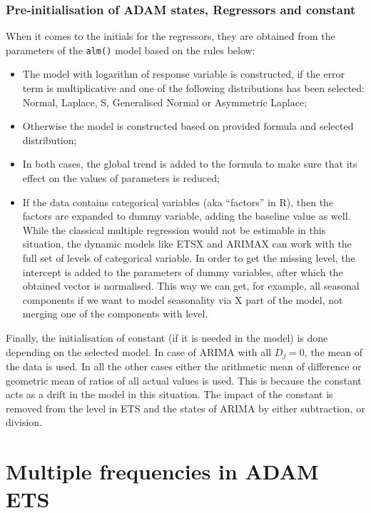 \documentclass[
]{book}
\providecommand{\tightlist}{%
  \setlength{\itemsep}{0pt}\setlength{\parskip}{0pt}}
\theoremstyle{definition}
\theoremstyle{definition}
\theoremstyle{definition}
\theoremstyle{definition}
\theoremstyle{remark}
\begin{document}
\hypertarget{pre-initialisation-of-adam-states-regressors-and-constant}{%
\subsection{Pre-initialisation of ADAM states, Regressors and constant}\label{pre-initialisation-of-adam-states-regressors-and-constant}}

When it comes to the initials for the regressors, they are obtained from the parameters of the \texttt{alm()} model based on the rules below:

\begin{itemize}
\tightlist
\item
  The model with logarithm of response variable is constructed, if the error term is multiplicative and one of the following distributions has been selected: Normal, Laplace, S, Generalised Normal or Asymmetric Laplace;
\item
  Otherwise the model is constructed based on provided formula and selected distribution;
\item
  In both cases, the global trend is added to the formula to make sure that its effect on the values of parameters is reduced;
\item
  If the data contains categorical variables (aka ``factors'' in R), then the factors are expanded to dummy variable, adding the baseline value as well. While the classical multiple regression would not be estimable in this situation, the dynamic models like ETSX and ARIMAX can work with the full set of levels of categorical variable. In order to get the missing level, the intercept is added to the parameters of dummy variables, after which the obtained vector is normalised. This way we can get, for example, all seasonal components if we want to model seasonality via X part of the model, not merging one of the components with level.
\end{itemize}

Finally, the initialisation of constant (if it is needed in the model) is done depending on the selected model. In case of ARIMA with all \(D_j=0\), the mean of the data is used. In all the other cases either the arithmetic mean of difference or geometric mean of ratios of all actual values is used. This is because the constant acts as a drift in the model in this situation. The impact of the constant is removed from the level in ETS and the states of ARIMA by either subtraction, or division.

\hypertarget{multiple-frequencies-in-adam-ets}{%
\chapter{Multiple frequencies in ADAM ETS}\label{multiple-frequencies-in-adam-ets}}
\end{document}
